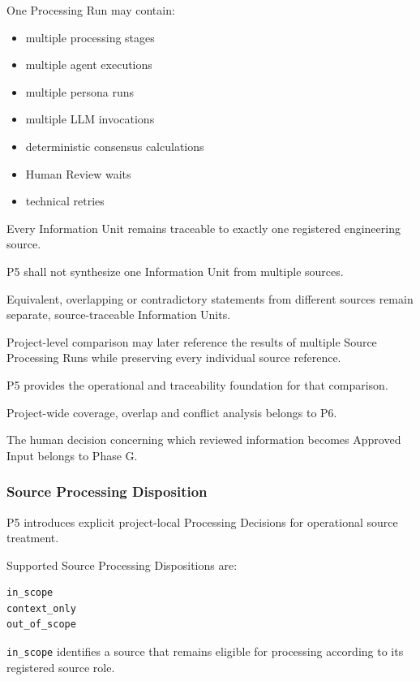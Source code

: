 One Processing Run may contain:

\begin{itemize}
\tightlist
\item
  multiple processing stages
\item
  multiple agent executions
\item
  multiple persona runs
\item
  multiple LLM invocations
\item
  deterministic consensus calculations
\item
  Human Review waits
\item
  technical retries
\end{itemize}

Every Information Unit remains traceable to exactly one registered engineering source.

P5 shall not synthesize one Information Unit from multiple sources.

Equivalent, overlapping or contradictory statements from different sources remain separate, source-traceable Information Units.

Project-level comparison may later reference the results of multiple Source Processing Runs while preserving every individual source reference.

P5 provides the operational and traceability foundation for that comparison.

Project-wide coverage, overlap and conflict analysis belongs to P6.

The human decision concerning which reviewed information becomes Approved Input belongs to Phase G.

\hypertarget{source-processing-disposition}{%
\subsubsection{Source Processing Disposition}\label{source-processing-disposition}}

P5 introduces explicit project-local Processing Decisions for operational source treatment.

Supported Source Processing Dispositions are:

\begin{verbatim}
in_scope
context_only
out_of_scope
\end{verbatim}

\texttt{in\_scope} identifies a source that remains eligible for processing according to its registered source role.

